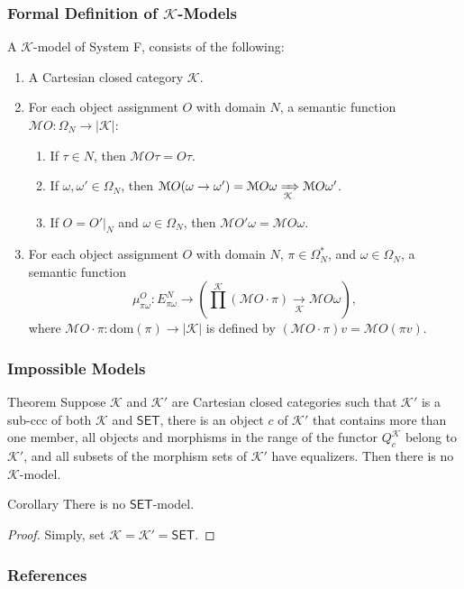\watermarkoff
\begin{frame}[fragile]
    \frametitle{Formal Definition of $\mathcal{K}$-Models}

    A $\mathcal{K}$-model of System F, consists of the following:
    \begin{enumerate}
        \item A Cartesian closed category $\mathcal{K}$.
        \item For each object assignment $O$ with domain $N$, a semantic function $\mathcal{M}O \colon \Omega_N \rightarrow |\mathcal{K}|$:
        \begin{enumerate}
            \item If $\tau \in N$, then $\mathcal{M}O\tau = O\tau$.
            \item If $\omega, \omega' \in \Omega_N$, then $\mathcal{M}O(\omega \rightarrow \omega') = \mathcal{M}O\omega \xRightarrow[\mathcal{K}]{} \mathcal{M}O\omega'$.
            \item If $O = O'|_N$ and $\omega \in \Omega_N$, then $\mathcal{M}O'\omega = \mathcal{M}O\omega$.
        \end{enumerate}
        \item For each object assignment $O$ with domain $N$, $\pi \in \Omega^*_N$, and $\omega \in \Omega_N$, a semantic function 
        \[
        \mu^O_{\pi\omega} \colon E^N_{\pi\omega} \rightarrow \left(\prod^\mathcal{K}\left(\mathcal{M}O \cdot \pi\right) \xrightarrow[\mathcal{K}]{} \mathcal{M}O\omega\right),
        \]
        where $\mathcal{M}O \cdot \pi \colon \mathrm{dom}(\pi) \rightarrow |\mathcal{K}|$ is defined by $(\mathcal{M}O \cdot \pi)v = \mathcal{M}O(\pi v)$.
    \end{enumerate}
\end{frame}

\watermarkon
\begin{frame}[fragile]
    \frametitle{Impossible Models}
    
    \begin{block}{Theorem}
		Suppose $\mathcal{K}$ and $\mathcal{K}'$ are Cartesian closed categories such that $\mathcal{K}'$ is a sub-ccc of both $\mathcal{K}$ and $\mathsf{SET}$, there is an object $c$ of $\mathcal{K}'$ that contains more than one member, all objects and morphisms in the range of the functor $Q_c^\mathcal{K}$ belong to $\mathcal{K}'$, and all subsets of the morphism sets of $\mathcal{K}'$ have equalizers. Then there is no $\mathcal{K}$-model.
	\end{block}
	
	\begin{block}{Corollary}
	    There is no $\mathsf{SET}$-model.
	\end{block}
	
	\begin{proof}
	Simply, set $\mathcal{K} = \mathcal{K}' = \mathsf{SET}$.
	\end{proof}
\end{frame}


\begin{frame}[t,allowframebreaks]
\nocite{*}
\frametitle{References}


\end{frame}
